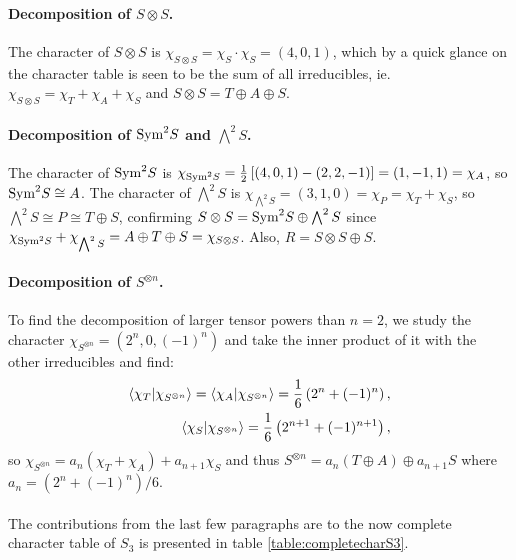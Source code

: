 \paragraph{Decomposition of $S \otimes S$.} The character of $S \otimes S$ is $\chi_{S \otimes S} = \chi_S \cdot \chi_S = (4,0,1)$, which by a quick glance on the character table is seen to be the sum of all irreducibles, ie. $\chi_{S \otimes S} = \chi_T + \chi_A + \chi_S$ and $S \otimes S = T \oplus A \oplus S$.

\paragraph{Decomposition of $\text{Sym}^2S$ and $\bigwedge^2S$.} The character of $\text{Sym}^2S$ is $\chi_{\text{Sym}^2S} = \frac{1}{2}\left[ (4,0,1) - (2,2,-1) \right] = (1,-1,1) = \chi_A$, so $\text{Sym}^2S \cong A$. The character of $\bigwedge^2S$ is $\chi_{\bigwedge^2S} = (3,1,0) = \chi_P = \chi_T + \chi_S$, so $\bigwedge^2S \cong P \cong T \oplus S$, confirming $S \otimes S = \text{Sym}^2S \oplus \bigwedge^2S$ since $\chi_{\text{Sym}^2S} + \chi_{\bigwedge^2S} = A \oplus T \oplus S = \chi_{S \otimes S}$. Also, $R = S \otimes S \oplus S$.

\paragraph{Decomposition of $S^{\otimes n}$.}\cite[Exercise 2.7.]{FultonHarris} To find the decomposition of larger tensor powers than $n=2$, we study the character $\chi_{S^{\otimes n}} = (2^n, 0, (-1)^n)$ and take the inner product of it with the other irreducibles and find:
\begin{align}
	\bra{\chi_T}\ket{\chi_{S^{\otimes n}}} = \bra{\chi_A}\ket{\chi_{S^{\otimes n}}} = \frac{1}{6}\left(2^n + (-1)^n\right), \\
	\bra{\chi_S}\ket{\chi_{S^{\otimes n}}} = \frac{1}{6}\left(2^{n+1} + (-1)^{n+1}\right), 
\end{align}
so $\chi_{S^{\otimes n}} = a_n (\chi_T + \chi_A) + a_{n+1} \chi_S$ and thus $S^{\otimes n} = a_n (T \oplus A) \oplus a_{n+1} S$ where $a_n = \left(2^n + (-1)^n\right)/6$.

\paragraph{} The contributions from the last few paragraphs are to the now complete character table of $S_3$ is presented in table \ref{table:completecharS3}.

